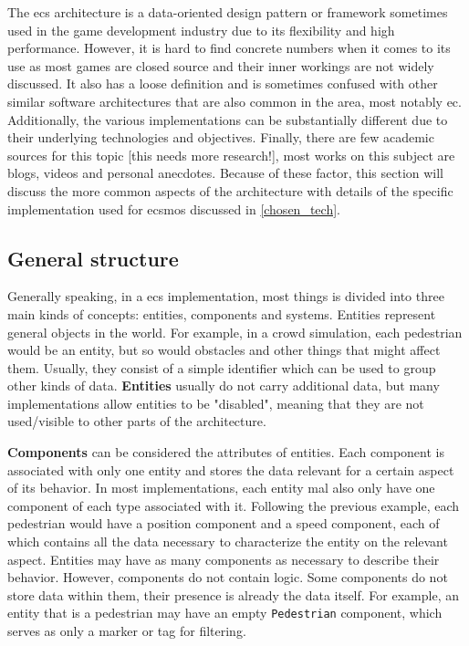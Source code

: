 \documentclass[twoside, 11pt]{article}
\begin{document}
The \gls{ecs} architecture is a data-oriented design pattern or framework sometimes used in the game development industry due to its flexibility and high performance. However, it is hard to find concrete numbers when it comes to its use as most games are closed source and their inner workings are not widely discussed. It also has a loose definition and is sometimes confused with other similar software architectures that are also common in the area, most notably \gls{ec}. Additionally, the various implementations can be substantially different due to their underlying technologies and objectives. Finally, there are few academic sources for this topic [this needs more research!], most works on this subject are blogs, videos and personal anecdotes. Because of these factor, this section will discuss the more common aspects of the architecture with details of the specific implementation used for \gls{ecsmos} discussed in \ref{chosen_tech}.

\subsection{General structure}

Generally speaking, in a \gls{ecs} implementation, most things is divided into three main kinds of concepts: entities, components and systems. Entities represent general objects in the world. For example, in a crowd simulation, each pedestrian would be an entity, but so would obstacles and other things that might affect them. Usually, they consist of a simple identifier which can be used to group other kinds of data. \textbf{Entities} usually do not carry additional data, but many implementations allow entities to be "disabled", meaning that they are not used/visible to other parts of the architecture.


\textbf{Components} can be considered the attributes of entities. Each component is associated with only one entity and stores the data relevant for a certain aspect of its behavior. In most implementations, each entity mal also only have one component of each type associated with it. Following the previous example, each pedestrian would have a position component and a speed component, each of which contains all the data necessary to characterize the entity on the relevant aspect. Entities may have as many components as necessary to describe their behavior. However, components do not contain logic. Some components do not store data within them, their presence is already the data itself. For example, an entity that is a pedestrian may have an empty \verb|Pedestrian| component, which serves as only a marker or tag for filtering.
\end{document}
